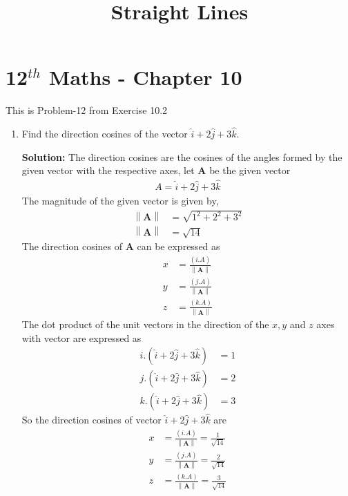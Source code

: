 \documentclass[12pt]{article}
\providecommand{\norm}[1]{\left\lVert#1\right\rVert}
\newcommand{\solution}{\noindent \textbf{Solution: }}
\let\vec\mathbf
\begin{document}
\begin{center}
\enlargethispage{-4cm}
\title{\textbf{Straight Lines}}
\date{\vspace{-5ex}} %
\maketitle
\end{center}
\setcounter{page}{1}
\section*{12$^{th}$ Maths - Chapter 10}
This is Problem-12 from Exercise 10.2
\begin{enumerate}
\item Find the direction cosines of the vector $\hat{i} +2\hat{j}+3\hat{k}$.

\solution The direction cosines are the cosines of the angles formed by the given vector with the respective axes, let $\vec{A}$ be the given vector
\begin{align}
A =\hat{i} +2\hat{j}+3\hat{k}
\end{align}
The magnitude of the given vector is given by,
\begin{align}
\norm{\vec{A}}&=\sqrt{1^2+2^2+3^2}\\
\norm{\vec{A}} &=\sqrt{14}
\end{align}
The direction cosines of $\vec{A}$ can be expressed as
\begin{align}
x &=\frac{(i.A)}{\norm{\vec{A}}}\\
y &=\frac{(j.A)}{\norm{\vec{A}}}\\
z &=\frac{(k.A)}{\norm{\vec{A}}}
\end{align}
The dot product of the unit vectors in the direction of the $x,y$ and $z$ axes with vector are expressed as
\begin{align}
i.(\hat{i} +2\hat{j}+3\hat{k}) &=1\\
j.(\hat{i} +2\hat{j}+3\hat{k}) &=2\\
k.(\hat{i} +2\hat{j}+3\hat{k}) &=3
\end{align}
So the direction cosines of vector $\hat{i} +2\hat{j}+3\hat{k}$ are
\begin{align}
x &=\frac{(i.A)}{\norm{\vec{A}}}= \frac{1}{\sqrt{14}}\\
y &=\frac{(j.A)}{\norm{\vec{A}}}= \frac{2}{\sqrt{14}}\\
z &=\frac{(k.A)}{\norm{\vec{A}}}= \frac{3}{\sqrt{14}}
\end{align}



\end{enumerate}
\end{document}
